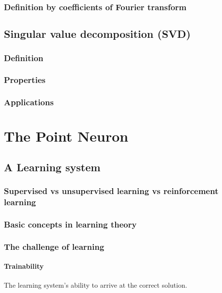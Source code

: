 \documentclass[11pt]{book} %
\begin{document}
\subsection{Definition by coefficients of Fourier transform}

\section{Singular value decomposition (SVD)}
\subsection{Definition}
\subsection{Properties}
\subsection{Applications}

%
%
%
%
%
%
%
%
%
%
%
%
%
%
%
%

\chapter{The Point Neuron}

\section{A Learning system}
\subsection{Supervised vs unsupervised learning vs reinforcement learning}

%
%
%

\subsection{Basic concepts in learning theory}

%
%
%

\subsection{The challenge of learning}
\subsubsection{Trainability}
The learning system's ability to arrive at the correct solution.
\end{document}
